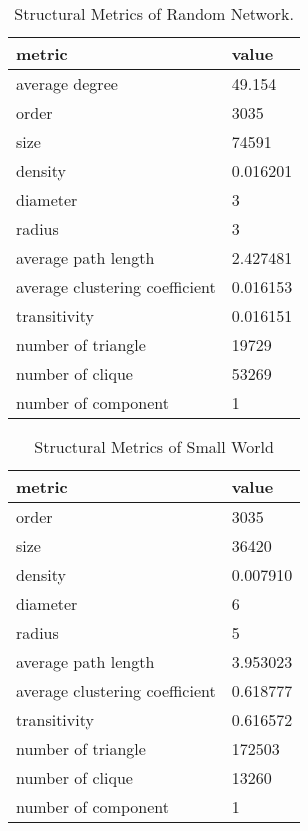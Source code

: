 \documentclass[runningheads]{llncs}
\begin{document}
\begin{table}
\centering
\caption{Structural Metrics of Random Network.}\label{tab_random}
\begin{tabular}{|l|l|}
\hline
metric & value \\
\hline
average degree & 49.154 \\
order & 3035 \\
size & 74591 \\
density & 0.016201 \\
diameter & 3 \\
radius & 3 \\
average path length & 2.427481 \\
average clustering coefficient & 0.016153 \\
transitivity & 0.016151 \\
number of triangle & 19729 \\
number of clique & 53269 \\
number of component & 1 \\
\hline
\end{tabular}
\end{table}




\begin{table}
\centering
\caption{Structural Metrics of Small World}\label{tab_smallworld}
\begin{tabular}{|l|l|}
\hline
metric & value \\
\hline
order & 3035 \\
size & 36420 \\
density & 0.007910 \\
diameter & 6 \\
radius & 5 \\
average path length & 3.953023 \\
average clustering coefficient & 0.618777 \\
transitivity & 0.616572 \\
number of triangle & 172503 \\
number of clique & 13260 \\
number of component & 1 \\
\hline
\end{tabular}
\end{table}
\end{document}

